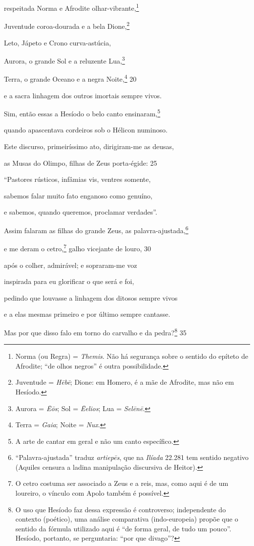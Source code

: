 respeitada Norma e Afrodite olhar-vibrante,\footnote{Norma (ou Regra) = \emph{Themis}. Não há segurança sobre o sentido do epíteto de Afrodite; ``de olhos
negros'' é outra possibilidade.}

Juventude coroa-dourada e a bela Dione,\footnote{Juventude = \emph{Hēbē}; Dione: em Homero, é a mãe de Afrodite, mas não em Hesíodo.}

Leto, Jápeto e Crono curva-astúcia,

Aurora, o grande Sol e a reluzente Lua,\footnote{Aurora = \emph{Ēōs}; Sol = \emph{Ēelios}; Lua = \emph{Selēnē}.}

Terra, o grande Oceano e a negra Noite,\footnote{Terra = \emph{Gaia}; Noite = \emph{Nux}.} \num{20}

e a sacra linhagem dos outros imortais sempre vivos.

\quad{}Sim, então essas a Hesíodo o belo canto ensinaram,\footnote{A arte de cantar em geral e não um canto específico.}

quando apascentava cordeiros sob o Hélicon numinoso.

Este discurso, primeiríssimo ato, dirigiram-me as deusas,

as Musas do Olimpo, filhas de Zeus porta-égide: \num{25}

``Pastores rústicos, infâmias vis, ventres somente,

sabemos falar muito fato enganoso como genuíno,

e sabemos, quando queremos, proclamar verdades''.

Assim falaram as filhas do grande Zeus, as \qb{}palavra-ajustada,\footnote{``Palavra-ajustada'' traduz \emph{artiepēs}, que na \emph{Ilíada}
22.281 tem sentido negativo (Aquiles censura a ladina manipulação
discursiva de Heitor).}

e me deram o cetro,\footnote{O cetro costuma ser associado a Zeus e a reis, mas, como aqui é de
um loureiro, o vínculo com Apolo também é possível.} galho vicejante de louro, \num{30}

após o colher, admirável; e sopraram-me voz

inspirada para eu glorificar o que será e foi,

pedindo que louvasse a linhagem dos ditosos sempre vivos

e a elas mesmas primeiro e por último sempre cantasse.

\quad{}Mas por que disso falo em torno do carvalho e da pedra?\footnote{O uso que Hesíodo faz dessa expressão é controverso; independente do
contexto (poético), uma análise comparativa (indo-europeia) propõe que o
sentido da fórmula utilizado aqui é ``de forma geral, de tudo um
pouco''. Hesíodo, portanto, se perguntaria: ``por que divago''?} \num{35}

